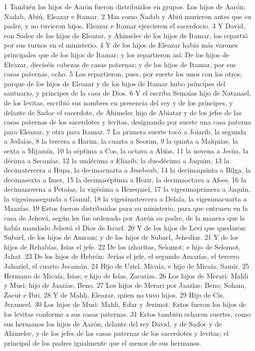 1 También los hijos de Aarón fueron distribuidos en grupos. Los hijos de Aarón: Nadab, Abiú, Eleazar e Itamar.
2 Mas como Nadab y Abiú murieron antes que su padre, y no tuvieron hijos, Eleazar e Itamar ejercieron el sacerdocio.
3 Y David, con Sadoc de los hijos de Eleazar, y Ahimelec de los hijos de Itamar, los repartió por sus turnos en el ministerio.
4 Y de los hijos de Eleazar había más varones principales que de los hijos de Itamar; y los repartieron así: De los hijos de Eleazar, dieciséis cabezas de casas paternas; y de los hijos de Itamar, por sus casas paternas, ocho.
5 Los repartieron, pues, por suerte los unos con los otros; porque de los hijos de Eleazar y de los hijos de Itamar hubo príncipes del santuario, y príncipes de la casa de Dios.
6 Y el escriba Semaías hijo de Natanael, de los levitas, escribió sus nombres en presencia del rey y de los príncipes, y delante de Sadoc el sacerdote, de Ahimelec hijo de Abiatar y de los jefes de las casas paternas de los sacerdotes y levitas, designando por suerte una casa paterna para Eleazar, y otra para Itamar.
7 La primera suerte tocó a Joiarib, la segunda a Jedaías,
8 la tercera a Harim, la cuarta a Seorim,
9 la quinta a Malquías, la sexta a Mijamín,
10 la séptima a Cos, la octava a Abías,
11 la novena a Jesúa, la décima a Secanías,
12 la undécima a Eliasib, la duodécima a Jaquim,
13 la decimatercera a Hupa, la decimacuarta a Jesebeab,
14 la decimaquinta a Bilga, la decimasexta a Imer,
15 la decimaséptima a Hezir, la decimaoctava a Afses,
16 la decimanovena a Petaías, la vigésima a Hezequiel,
17 la vigesimaprimera a Jaquín, la vigesimasegunda a Gamul,
18 la vigesimatercera a Delaía, la vigesimacuarta a Maazías.
19 Estos fueron distribuidos para su ministerio, para que entrasen en la casa de Jehová, según les fue ordenado por Aarón su padre, de la manera que le había mandado Jehová el Dios de Israel.
20 Y de los hijos de Leví que quedaron: Subael, de los hijos de Amram; y de los hijos de Subael, Jehedías.
21 Y de los hijos de Rehabías, Isías el jefe.
22 De los izharitas, Selomot; e hijo de Selomot, Jahat.
23 De los hijos de Hebrón: Jerías el jefe, el segundo Amarías, el tercero Jahaziel, el cuarto Jecamán.
24 Hijo de Uziel, Micaía; e hijo de Micaía, Samir.
25 Hermano de Micaía, Isías; e hijo de Isías, Zacarías.
26 Los hijos de Merari: Mahli y Musi; hijo de Jaazías, Beno.
27 Los hijos de Merari por Jaazías: Beno, Soham, Zacur e Ibri.
28 Y de Mahli, Eleazar, quien no tuvo hijos.
29 Hijo de Cis, Jerameel.
30 Los hijos de Musi: Mahli, Edar y Jerimot. Estos fueron los hijos de los levitas conforme a sus casas paternas.
31 Estos también echaron suertes, como sus hermanos los hijos de Aarón, delante del rey David, y de Sadoc y de Ahimelec, y de los jefes de las casas paternas de los sacerdotes y levitas; el principal de los padres igualmente que el menor de sus hermanos.

